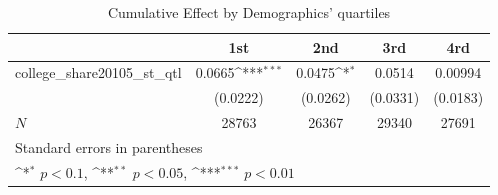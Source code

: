 \begin{table}[htbp]\centering
\def\sym#1{\ifmmode^{#1}\else\(^{#1}\)\fi}
\caption{Cumulative Effect by Demographics' quartiles}
\begin{tabular}{l*{4}{c}}
\hline\hline
            &\multicolumn{1}{c}{1st}&\multicolumn{1}{c}{2nd}&\multicolumn{1}{c}{3rd}&\multicolumn{1}{c}{4rd}\\
\hline
college\_share20105\_st\_qtl&      0.0665\sym{***}&      0.0475\sym{*}  &      0.0514         &     0.00994         \\
            &    (0.0222)         &    (0.0262)         &    (0.0331)         &    (0.0183)         \\
\hline
\(N\)       &       28763         &       26367         &       29340         &       27691         \\
\hline\hline
\multicolumn{5}{l}{\footnotesize Standard errors in parentheses}\\
\multicolumn{5}{l}{\footnotesize \sym{*} \(p<0.1\), \sym{**} \(p<0.05\), \sym{***} \(p<0.01\)}\\
\end{tabular}
\end{table}
